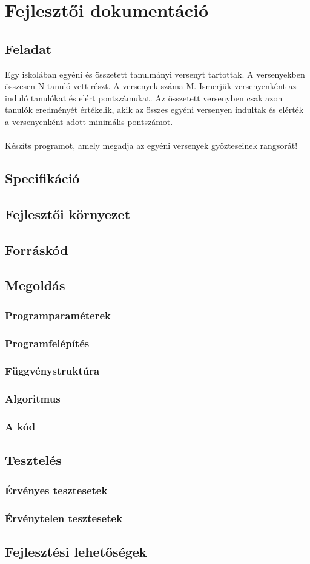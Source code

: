 \documentclass{article}
\begin{document}
  \newpage

  \section{Fejlesztői dokumentáció}
    \subsection{Feladat}
      Egy iskolában egyéni és összetett tanulmányi versenyt tartottak. A versenyekben összesen N tanuló vett részt. A versenyek száma M. Ismerjük versenyenként az induló tanulókat és elért pontszámukat. Az összetett versenyben csak azon tanulók eredményét értékelik, akik az összes egyéni versenyen indultak és elérték a versenyenként adott minimális pontszámot.
      \\
      \\ Készíts programot, amely megadja az egyéni versenyek győzteseinek rangsorát!
    \subsection{Specifikáció}
    \subsection{Fejlesztői környezet}
    \subsection{Forráskód}
    \subsection{Megoldás}
      \subsubsection{Programparaméterek}
      \subsubsection{Programfelépítés}
      \subsubsection{Függvénystruktúra}
      \subsubsection{Algoritmus}
      \subsubsection{A kód}
    \subsection{Tesztelés}
      \subsubsection{Érvényes tesztesetek}
      \subsubsection{Érvénytelen tesztesetek}
    \subsection{Fejlesztési lehetőségek}
\end{document}
